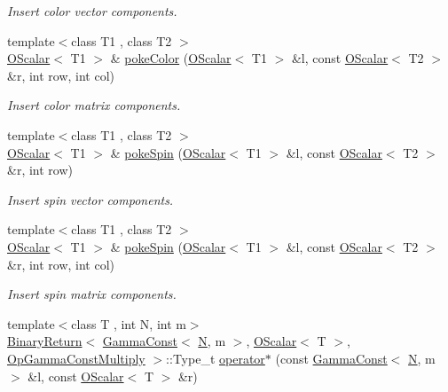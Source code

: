 \begin{DoxyCompactItemize}
\begin{DoxyCompactList}\small\item\em Insert color vector components. \end{DoxyCompactList}\item 
{\footnotesize template$<$class T1 , class T2 $>$ }\\\mbox{\hyperlink{classENSEM_1_1OScalar}{O\+Scalar}}$<$ T1 $>$ \& \mbox{\hyperlink{group__obsscalar_ga9271cf018f5c0e5f74f6b065b68f91b9}{poke\+Color}} (\mbox{\hyperlink{classENSEM_1_1OScalar}{O\+Scalar}}$<$ T1 $>$ \&l, const \mbox{\hyperlink{classENSEM_1_1OScalar}{O\+Scalar}}$<$ T2 $>$ \&r, int row, int col)
\begin{DoxyCompactList}\small\item\em Insert color matrix components. \end{DoxyCompactList}\item 
{\footnotesize template$<$class T1 , class T2 $>$ }\\\mbox{\hyperlink{classENSEM_1_1OScalar}{O\+Scalar}}$<$ T1 $>$ \& \mbox{\hyperlink{group__obsscalar_ga4ad5af637811a273152545d97b009c62}{poke\+Spin}} (\mbox{\hyperlink{classENSEM_1_1OScalar}{O\+Scalar}}$<$ T1 $>$ \&l, const \mbox{\hyperlink{classENSEM_1_1OScalar}{O\+Scalar}}$<$ T2 $>$ \&r, int row)
\begin{DoxyCompactList}\small\item\em Insert spin vector components. \end{DoxyCompactList}\item 
{\footnotesize template$<$class T1 , class T2 $>$ }\\\mbox{\hyperlink{classENSEM_1_1OScalar}{O\+Scalar}}$<$ T1 $>$ \& \mbox{\hyperlink{group__obsscalar_gadabf69e63453311d92faee77643c2b7a}{poke\+Spin}} (\mbox{\hyperlink{classENSEM_1_1OScalar}{O\+Scalar}}$<$ T1 $>$ \&l, const \mbox{\hyperlink{classENSEM_1_1OScalar}{O\+Scalar}}$<$ T2 $>$ \&r, int row, int col)
\begin{DoxyCompactList}\small\item\em Insert spin matrix components. \end{DoxyCompactList}\item 
{\footnotesize template$<$class T , int N, int m$>$ }\\\mbox{\hyperlink{structENSEM_1_1BinaryReturn}{Binary\+Return}}$<$ \mbox{\hyperlink{classENSEM_1_1GammaConst}{Gamma\+Const}}$<$ \mbox{\hyperlink{operator__name__util_8cc_a7722c8ecbb62d99aee7ce68b1752f337}{N}}, m $>$, \mbox{\hyperlink{classENSEM_1_1OScalar}{O\+Scalar}}$<$ T $>$, \mbox{\hyperlink{structENSEM_1_1OpGammaConstMultiply}{Op\+Gamma\+Const\+Multiply}} $>$\+::Type\+\_\+t \mbox{\hyperlink{group__obsscalar_ga3db0be55f47b788fa0f005d8e7bcfbac}{operator$\ast$}} (const \mbox{\hyperlink{classENSEM_1_1GammaConst}{Gamma\+Const}}$<$ \mbox{\hyperlink{operator__name__util_8cc_a7722c8ecbb62d99aee7ce68b1752f337}{N}}, m $>$ \&l, const \mbox{\hyperlink{classENSEM_1_1OScalar}{O\+Scalar}}$<$ T $>$ \&r)

\end{DoxyCompactItemize}
